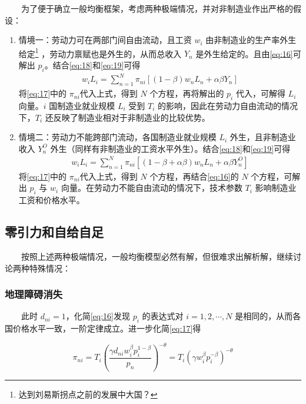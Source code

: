 \documentclass[]{article}
\let\rmarkdownfootnote\footnote%
\def\footnote{\protect\rmarkdownfootnote}
\begin{document}
　　为了便于确立一般均衡框架，考虑两种极端情况，并对非制造业作出严格的假设：

\begin{enumerate}
\def\labelenumi{\arabic{enumi}.}
\item
  情境一：劳动力可在两部门间自由流动，且工资 \(w_i\) 由非制造业的生产率外生给定\footnote{达到刘易斯拐点之前的发展中大国？} ，劳动力禀赋也是外生的，从而总收入 \(Y_n\) 是外生给定的。且由\eqref{eq:16}可解出 \(p_i\)。结合\eqref{eq:18}和\eqref{eq:19}可得
  \begin{align}
  w_{i} L_{i}=\sum_{n=1}^{N} \pi_{n i}\left[(1-\beta) w_{n} L_{n}+\alpha \beta Y_{n}\right] \label{eq:20}
  \end{align}
  将\eqref{eq:17}中的 \(\pi_{ni}\)代入上式，得到 \(N\) 个方程，再将解出的 \(p_i\) 代入，可解得 \(L_{i}\) 向量。\(i\) 国制造业就业规模 \(L_{i}\) 受到 \(T_i\) 的影响，因此在劳动力自由流动的情况下，\(T_i\) 还反映了制造业相对于非制造业的比较优势。
\item
  情境二：劳动力不能跨部门流动，各国制造业就业规模 \(L_{i}\) 外生，且非制造业收入 \(Y_n^O\) 外生（同样有非制造业的工资水平外生）。结合\eqref{eq:18}和\eqref{eq:19}可得
  \begin{align}
  w_{i} L_{i}=\sum_{n=1}^{N} \pi_{n i}\left[(1-\beta+\alpha \beta) w_{n} L_{n}+\alpha \beta Y_{n}^{O}\right] \label{eq:21}
  \end{align}
  将\eqref{eq:17}中的 \(\pi_{ni}\)代入上式，得到 \(N\) 个方程，再结合\eqref{eq:16}的 \(N\) 个方程，可解出 \(p_i\) 与 \(w_{i}\) 向量。在劳动力不能自由流动的情况下，技术参数 \(T_i\) 影响制造业工资和价格水平。
\end{enumerate}

\hypertarget{section-20}{%
\subsection{零引力和自给自足}\label{section-20}}

　　按照上述两种极端情况，一般均衡模型必然有解，但很难求出解析解，继续讨论两种特殊情况：

\hypertarget{section-21}{%
\subsubsection{地理障碍消失}\label{section-21}}

　　此时 \(d_{ni}=1\)，化简\eqref{eq:16}发现 \(p_i\) 的表达式对 \(i=1,2,\cdots,N\) 是相同的，从而各国价格水平一致，一阶定律成立。进一步化简\eqref{eq:17}得

\[\pi_{n i}=T_{i}\left(\frac{\gamma d_{n i} w_{i}^{\beta} p_{i}^{1-\beta}}{p_{n}}\right)^{-\theta}=T_{i}\left(\gamma w_{i}^{\beta} p_{i}^{-\beta}\right)^{-\theta}\]
\end{document}
